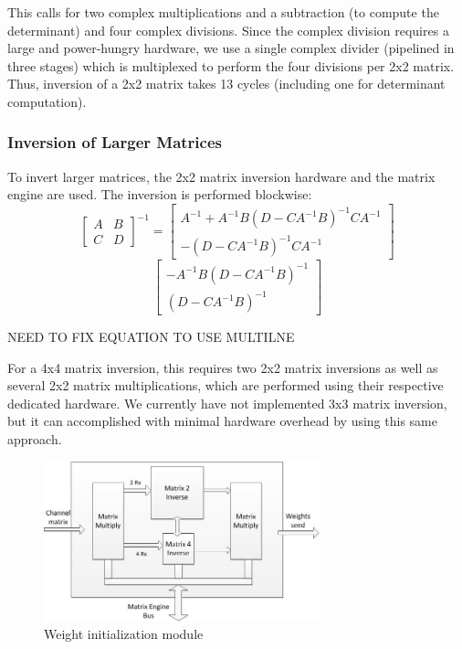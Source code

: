 \documentclass[journal]{IEEEtran}
\begin{document}
This calls for two complex multiplications and a subtraction (to compute the determinant) and four complex divisions. Since the complex division requires a large and power-hungry hardware, we use a single complex divider (pipelined in three stages) which is multiplexed to perform the four divisions per 2x2 matrix. Thus, inversion of a 2x2 matrix takes 13 cycles (including one for determinant computation).

\subsubsection{Inversion of Larger Matrices}

To invert larger matrices, the 2x2 matrix inversion hardware and the matrix engine are used. The inversion is performed blockwise:
\[\left[ \begin{array}{cc} A & B \\ C & D \end{array}\right]^{-1} = \left[ \begin{array}{c} A^{-1}+A^{-1}B(D-CA^{-1}B)^{-1}CA^{-1} \\ -(D-CA^{-1}B)^{-1}CA^{-1} \end{array} \right] \]
\[ \left[ \begin{array}{c} -A^{-1}B(D-CA^{-1}B)^{-1} \\  (D-CA^{-1}B)^{-1} \end{array}\right]\]

NEED TO FIX EQUATION TO USE MULTILNE

For a 4x4 matrix inversion, this requires two 2x2 matrix inversions as well as several 2x2 matrix multiplications, which are performed using their respective dedicated hardware. We currently have not implemented 3x3 matrix inversion, but it can accomplished with minimal hardware overhead by using this same approach. 

\begin{figure}
\centering
\includegraphics*[width=8cm]{images/initialize_weights.jpg}
\caption{Weight initialization module}
\label{initialize_weights}
\end{figure}
\end{document}
